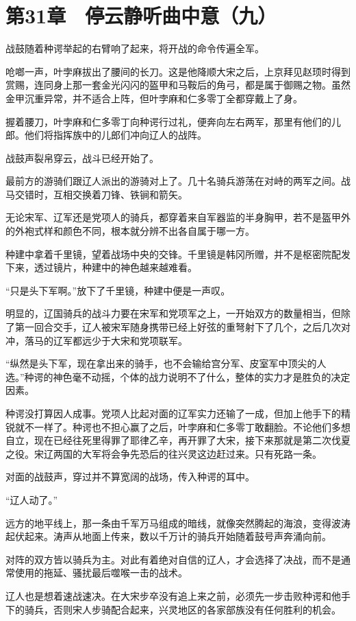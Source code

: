 \section{第31章　停云静听曲中意（九）}

战鼓随着种谔举起的右臂响了起来，将开战的命令传遍全军。

呛啷一声，叶孛麻拔出了腰间的长刀。这是他降顺大宋之后，上京拜见赵顼时得到赏赐，连同身上那一套金光闪闪的盔甲和马鞍后的角弓，都是属于御赐之物。虽然金甲沉重异常，并不适合上阵，但叶孛麻和仁多零丁全都穿戴上了身。

握着腰刀，叶孛麻和仁多零丁向种谔行过礼，便奔向左右两军，那里有他们的儿郎。他们将指挥族中的儿郎们冲向辽人的战阵。

战鼓声裂帛穿云，战斗已经开始了。

最前方的游骑们跟辽人派出的游骑对上了。几十名骑兵游荡在对峙的两军之间。战马交错时，互相交换着刀锋、铁锏和箭矢。

无论宋军、辽军还是党项人的骑兵，都穿着来自军器监的半身胸甲，若不是盔甲外的外袍式样和颜色不同，根本就分辨不出各自属于哪一方。

种建中拿着千里镜，望着战场中央的交锋。千里镜是韩冈所赠，并不是枢密院配发下来，透过镜片，种建中的神色越来越难看。

“只是头下军啊。”放下了千里镜，种建中便是一声叹。

明显的，辽国骑兵的战斗力要在宋军和党项军之上，一开始双方的数量相当，但除了第一回合交手，辽人被宋军随身携带已经上好弦的重弩射下了几个，之后几次对冲，落马的辽军都远少于大宋和党项联军。

“纵然是头下军，现在拿出来的骑手，也不会输给宫分军、皮室军中顶尖的人选。”种谔的神色毫不动摇，个体的战力说明不了什么，整体的实力才是胜负的决定因素。

种谔没打算因人成事。党项人比起对面的辽军实力还输了一成，但加上他手下的精锐就不一样了。种谔也不担心赢了之后，叶孛麻和仁多零丁敢翻脸。不论他们多想自立，现在已经往死里得罪了耶律乙辛，再开罪了大宋，接下来那就是第二次伐夏之役。宋辽两国的大军将会争先恐后的往兴灵这边赶过来。只有死路一条。

对面的战鼓声，穿过并不算宽阔的战场，传入种谔的耳中。

“辽人动了。”

远方的地平线上，那一条由千军万马组成的暗线，就像突然腾起的海浪，变得波涛起伏起来。涛声从地面上传来，数以千万计的骑兵开始随着鼓号声奔涌向前。

对阵的双方皆以骑兵为主。对此有着绝对自信的辽人，才会选择了决战，而不是通常使用的拖延、骚扰最后噬喉一击的战术。

辽人也是想着速战速决。在大宋步卒没有追上来之前，必须先一步击败种谔和他手下的骑兵，否则宋人步骑配合起来，兴灵地区的各家部族没有任何胜利的机会。

